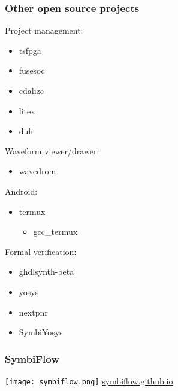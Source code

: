 \documentclass{beamer}
\begin{document}
\begin{frame}
\frametitle{Other open source projects}
\begin{minipage}[t]{.495\linewidth}
Project management:
\begin{itemize}
  \item tsfpga
  \href{https://gitlab.com/truestream/tsfpga}{\faGit} \href{https://truestream.gitlab.io/tsfpga/}{\faBook}
  \href{https://pypi.org/project/tsfpga/}{\faCode}

  \item fusesoc
  \href{https://github.com/olofk/fusesoc}{\faGithub}
  \href{https://fusesoc.rtfd.io/}{\faBook}
  \href{https://pypi.org/project/fusesoc/}{\faCode}

  \item edalize
  \href{https://github.com/olofk/edalize}{\faGithub}
  \href{https://edalize.rtfd.io}{\faBook}
  \href{https://pypi.org/project/edalize/}{\faCode}

  \item litex
  \href{https://github.com/enjoy-digital/litex}{\faGithub}

  \item duh
  \href{https://github.com/sifive/duh}{\faGithub}
\end{itemize}
\vspace{1em}

Waveform viewer/drawer:
\begin{itemize}
  \item wavedrom
  \href{https://github.com/wavedrom/wavedrom}{\faGithub}
  \href{https://wavedrom.com/}{\faGlobe}
\end{itemize}
\end{minipage}
\begin{minipage}[t]{.49\linewidth}
Android:
\begin{itemize}
  \item termux \href{https://termux.com/}{\faGlobe} \href{https://github.com/termux}{\faGithub}
  \begin{itemize}
      \item gcc\_termux \href{https://github.com/its-pointless/gcc_termux}{\faGithub}
  \end{itemize}
\end{itemize}
\vspace{1em}

Formal verification:
\begin{itemize}
  \item ghdlsynth-beta
  \href{https://github.com/tgingold/ghdlsynth-beta}{\faGithub}

  \item yosys
  \href{https://github.com/YosysHQ/yosys}{\faGithub}
  \href{http://www.clifford.at/yosys/}{\faGlobe}

  \item nextpnr
  \href{https://github.com/YosysHQ/nextpnr}{\faGithub}

  \item SymbiYosys
  \href{https://github.com/YosysHQ/SymbiYosys}{\faGithub}
  \href{https://symbiyosys.rtfd.io}{\faBook}
\end{itemize}
\end{minipage}
\end{frame}

\begin{frame}
\frametitle{SymbiFlow}
\centering
\texttt{[image: symbiflow.png]}
\vfill
\Large\href{https://symbiflow.github.io/}{symbiflow.github.io}
\end{frame}
\end{document}
